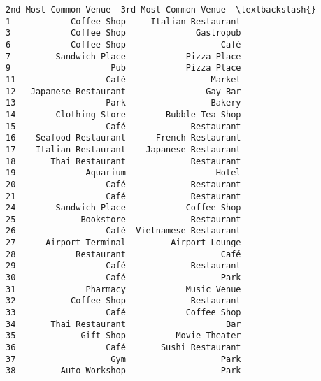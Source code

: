 \documentclass[11pt]{article}
\begin{document}
\begin{tcolorbox}[breakable, size=fbox, boxrule=.5pt, pad at break*=1mm, opacityfill=0]
\begin{Verbatim}[commandchars=\\\{\}]
   2nd Most Common Venue  3rd Most Common Venue  \textbackslash{}
1            Coffee Shop     Italian Restaurant
3            Coffee Shop              Gastropub
6            Coffee Shop                   Café
7         Sandwich Place            Pizza Place
9                    Pub            Pizza Place
11                  Café                 Market
12   Japanese Restaurant                Gay Bar
13                  Park                 Bakery
14        Clothing Store        Bubble Tea Shop
15                  Café             Restaurant
16    Seafood Restaurant      French Restaurant
17    Italian Restaurant    Japanese Restaurant
18       Thai Restaurant             Restaurant
19              Aquarium                  Hotel
20                  Café             Restaurant
21                  Café             Restaurant
24        Sandwich Place            Coffee Shop
25             Bookstore             Restaurant
26                  Café  Vietnamese Restaurant
27      Airport Terminal         Airport Lounge
28            Restaurant                   Café
29                  Café             Restaurant
30                  Café                   Park
31              Pharmacy            Music Venue
32           Coffee Shop             Restaurant
33                  Café            Coffee Shop
34       Thai Restaurant                    Bar
35             Gift Shop          Movie Theater
36                  Café       Sushi Restaurant
37                   Gym                   Park
38         Auto Workshop                   Park


\end{Verbatim}
\end{tcolorbox}
\end{document}
